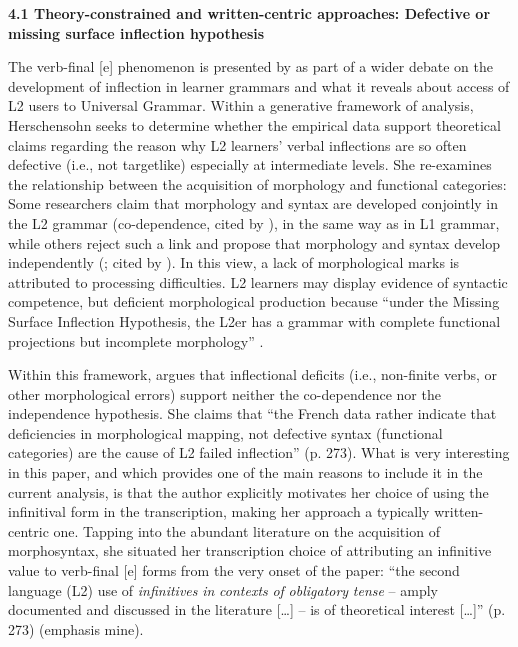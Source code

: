\documentclass[output=paper,colorlinks,citecolor=brown,modfonts,nonflat]{../langscibook}
\begin{document}
\textbf{4.1 Theory-constrained and written-centric approaches: Defective or missing surface inflection hypothesis}

The verb-final [e] phenomenon is presented by \citet{Herschensohn2001} as part of a wider debate on the development of inflection in learner grammars and what it reveals about access of L2 users to Universal Grammar. Within a generative framework of analysis, Herschensohn seeks to determine whether the empirical data support theoretical claims regarding the reason why L2 learners’ verbal inflections are so often defective (i.e., not targetlike) especially at intermediate levels. She re-examines the relationship between the acquisition of morphology and functional categories: Some researchers claim that morphology and syntax are developed conjointly in the L2 grammar (co-dependence, \citealt{Eubank1993, VainikkaYoung-Scholten1996, VainikkaYoung-Scholten1998Triggers, VainikkaYoung-Scholten1998Acquisition} cited by \citealt{Herschensohn2001}), in the same way as in L1 grammar, while others reject such a link and propose that morphology and syntax develop independently (\citealt{SchwartzSprouse1996}; \citealt{Lardière1998} cited by \citealt{Herschensohn2001}). In this view, a lack of morphological marks is attributed to processing difficulties. L2 learners may display evidence of syntactic competence, but deficient morphological production because “under the Missing Surface Inflection Hypothesis, the L2er has a grammar with complete functional projections but incomplete morphology” \citep[280]{Herschensohn2001}.

Within this framework, \citet{Herschensohn2001} argues that inflectional deficits (i.e., non-finite verbs, or other morphological errors) support neither the co-dependence nor the independence hypothesis. She claims that “the French data rather indicate that deficiencies in morphological mapping, not defective syntax (functional categories) are the cause of L2 failed inflection” (p. 273). What is very interesting in this paper, and which provides one of the main reasons to include it in the current analysis, is that the author explicitly motivates her choice of using the infinitival form in the transcription, making her approach a typically written-centric one. Tapping into the abundant literature on the acquisition of morphosyntax, she situated her transcription choice of attributing an infinitive value to verb-final [e] forms from the very onset of the paper: “the second language (L2) use of \textit{infinitives} \textit{in} \textit{contexts} \textit{of} \textit{obligatory} \textit{tense} – amply documented and discussed in the literature […] – is of theoretical interest […]” (p. 273) (emphasis mine).
\end{document}
